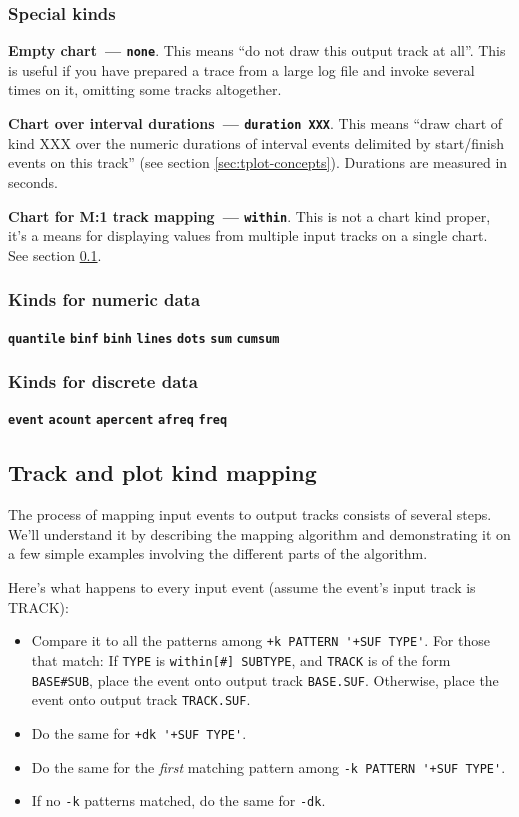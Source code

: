 \documentclass{article}
\begin{document}
\subsubsection{Special kinds}
\textbf{Empty chart~--- \texttt{none}}. This means ``do not draw this output track at all''. This is useful if you have prepared a trace from a large log file and invoke \timeplot{} several times on it, omitting some tracks altogether.

\textbf{Chart over interval durations~--- \texttt{duration XXX}}. This means ``draw chart of kind XXX over the numeric durations of interval events delimited by start/finish events on this track'' (see section \ref{sec:tplot-concepts}). Durations are measured in seconds.

\textbf{Chart for M:1 track mapping~--- \texttt{within}}. This is not a chart kind proper, it's a means for displaying values from multiple input tracks on a single chart. See section \ref{sec:tplot-track-mapping}.

\subsubsection{Kinds for numeric data}
\textbf{\texttt{quantile}}
\textbf{\texttt{binf}}
\textbf{\texttt{binh}}
\textbf{\texttt{lines}}
\textbf{\texttt{dots}}
\textbf{\texttt{sum}}
\textbf{\texttt{cumsum}}

\subsubsection{Kinds for discrete data}
\textbf{\texttt{event}}
\textbf{\texttt{acount}}
\textbf{\texttt{apercent}}
\textbf{\texttt{afreq}}
\textbf{\texttt{freq}}

\subsection{Track and plot kind mapping}
\label{sec:tplot-track-mapping}
The process of mapping input events to output tracks consists of several steps. We'll understand it by describing the mapping algorithm and demonstrating it on a few simple examples involving the different parts of the algorithm.

Here's what happens to every input event (assume the event's input track is TRACK):
\begin{itemize}
\item Compare it to all the patterns among \verb|+k PATTERN '+SUF TYPE'|. For those that match:
\subitem If \verb|TYPE| is \verb|within[#] SUBTYPE|, and \verb|TRACK| is of the form \verb|BASE#SUB|, place the event onto output track \verb|BASE.SUF|.
\subitem Otherwise, place the event onto output track \verb|TRACK.SUF|.
\item Do the same for \verb|+dk '+SUF TYPE'|.
\item Do the same for the \emph{first} matching pattern among \verb|-k PATTERN '+SUF TYPE'|.
\item If no \verb|-k| patterns matched, do the same for \verb|-dk|.
\end{itemize}
\end{document}
